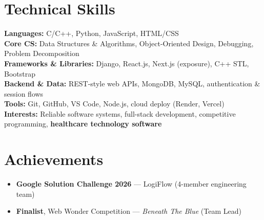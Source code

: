 \documentclass[a4paper,10pt]{article}
\begin{document}
\section{Technical Skills}
\noindent\small
\textbf{Languages:} C/C++, Python, JavaScript, HTML/CSS \\[0.35mm]
\textbf{Core CS:} Data Structures \& Algorithms, Object-Oriented Design, Debugging, Problem Decomposition \\[0.35mm]
\textbf{Frameworks \& Libraries:} Django, React.js, Next.js (exposure), C++ STL, Bootstrap \\[0.35mm]
\textbf{Backend \& Data:} REST-style web APIs, MongoDB, MySQL, authentication \& session flows \\[0.35mm]
\textbf{Tools:} Git, GitHub, VS Code, Node.js, cloud deploy (Render, Vercel) \\[0.35mm]
\textbf{Interests:} Reliable software systems, full-stack development, competitive programming, \textbf{healthcare technology software}

\section{Achievements}
\begin{itemize}
  \item \textbf{Google Solution Challenge 2026} --- LogiFlow (4-member engineering team)
  \item \textbf{Finalist}, Web Wonder Competition --- \textit{Beneath The Blue} (Team Lead)
\end{itemize}
\end{document}
